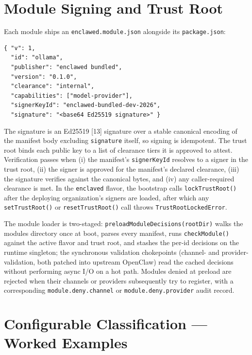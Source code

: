 \documentclass[11pt]{article}
\begin{document}
\section{Module Signing and Trust Root}
\label{sec:trust}

Each module ships an \texttt{enclawed.module.json} alongside its
\texttt{package.json}:

\begin{verbatim}
{ "v": 1,
  "id": "ollama",
  "publisher": "enclawed bundled",
  "version": "0.1.0",
  "clearance": "internal",
  "capabilities": ["model-provider"],
  "signerKeyId": "enclawed-bundled-dev-2026",
  "signature": "<base64 Ed25519 signature>" }
\end{verbatim}

The signature is an Ed25519 [13] signature over a stable canonical
encoding of the manifest body excluding \texttt{signature} itself, so
signing is idempotent. The trust root binds each public key to a list
of clearance tiers it is approved to attest. Verification passes when
(i) the manifest's \texttt{signerKeyId} resolves to a signer in the
trust root, (ii) the signer is approved for the manifest's declared
clearance, (iii) the signature verifies against the canonical bytes,
and (iv) any caller-required clearance is met. In the \texttt{enclaved}
flavor, the bootstrap calls \texttt{lockTrustRoot()} after the
deploying organization's signers are loaded, after which any
\texttt{setTrustRoot()} or \texttt{resetTrustRoot()} call throws
\texttt{TrustRootLockedError}.

The module loader is two-staged:
\texttt{preloadModuleDecisions(rootDir)} walks the modules directory
once at boot, parses every manifest, runs \texttt{checkModule()}
against the active flavor and trust root, and stashes the per-id
decisions on the runtime singleton; the synchronous validation
chokepoints (channel- and provider-validation, both patched into
upstream OpenClaw) read the cached decisions without performing async
I/O on a hot path. Modules denied at preload are rejected when their
channels or providers subsequently try to register, with a
corresponding \texttt{module.deny.channel} or
\texttt{module.deny.provider} audit record.

\section{Configurable Classification --- Worked Examples}
\end{document}
